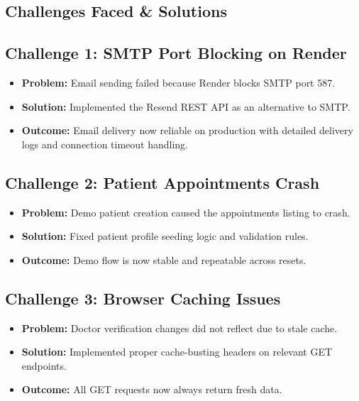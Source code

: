 \documentclass[11pt,a4paper]{article}
\begin{document}
\begin{itemize}
{\newpage

\section{Challenges Faced \& Solutions}

\subsection{Challenge 1: SMTP Port Blocking on Render}

\begin{itemize}
  \item \textbf{Problem:} Email sending failed because Render blocks SMTP port 587.
  \item \textbf{Solution:} Implemented the Resend REST API as an alternative to SMTP.
  \item \textbf{Outcome:} Email delivery now reliable on production with detailed delivery
        logs and connection timeout handling.
\end{itemize}

\subsection{Challenge 2: Patient Appointments Crash}

\begin{itemize}
  \item \textbf{Problem:} Demo patient creation caused the appointments listing to crash.
  \item \textbf{Solution:} Fixed patient profile seeding logic and validation rules.
  \item \textbf{Outcome:} Demo flow is now stable and repeatable across resets.
\end{itemize}

\subsection{Challenge 3: Browser Caching Issues}

\begin{itemize}
  \item \textbf{Problem:} Doctor verification changes did not reflect due to stale cache.
  \item \textbf{Solution:} Implemented proper cache-busting headers on relevant GET endpoints.
  \item \textbf{Outcome:} All GET requests now always return fresh data.
\end{itemize}

}
\end{itemize}
\end{document}
